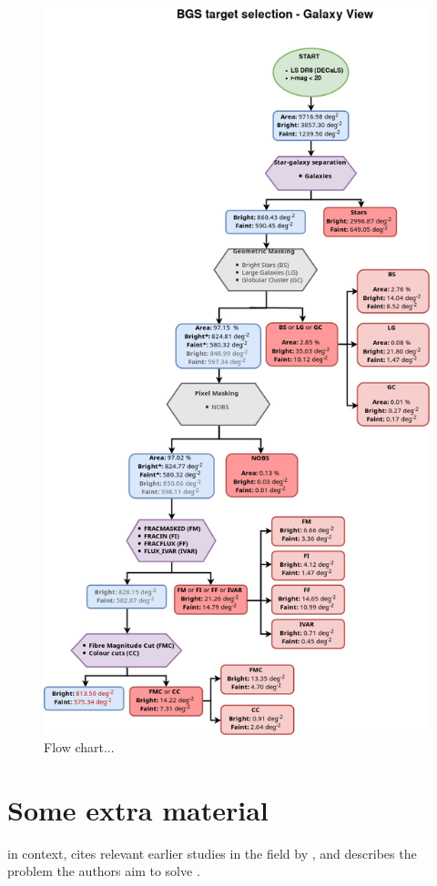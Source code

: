 \documentclass[fleqn,usenatbib]{mnras}
\begin{document}
\begin{figure}
	\includegraphics[width=12cm]{images/flow_galaxy.png}
    \caption{Flow chart...}
    \label{fig:flow_galaxy}
\end{figure}

\iffalse
\section{Some extra material}

in context, cites relevant earlier studies in the field by \citet{Others2013},
and describes the problem the authors aim to solve \citep[e.g.][]{Author2012}.
\end{document}
